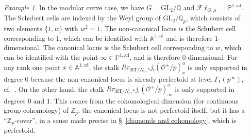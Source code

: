 \documentclass{amsart}
\theoremstyle{remark}
\newtheorem{example}[subsubsection]{Example}
\numberwithin{equation}{subsection}
\newcommand{\Q}{\QQ}
\newcommand{\Z}{\ZZ}
\newcommand{\QQ}{{\mathbb Q}}
\newcommand{\ZZ}{{\mathbb Z}}
\newcommand{\cO}{{\mathcal O}}
\newcommand{\HT}{\mathrm{HT}}
\newcommand{\Fl}{\mathscr{F}\!\ell}
\renewcommand{\(}{\left(}
\renewcommand{\)}{\right)}
\begin{document}
\begin{example} In the modular curve case, 
we have $G=\mathrm{GL}_2/\Q$ and $\Fl_{G,\mu} = \mathbb{P}^{1,\mathrm{ad}}$. 
The Schubert cells are indexed by the Weyl group of $\mathrm{GL}_2/\Q_p$, 
which consists of two elements $\{1,w\}$ with $w^2 = 1$. The non-canonical locus
is the Schubert cell corresponding to $1$, which can be identified with $\mathbb{A}^{1,\mathrm{ad}}$ and 
is therefore $1$-dimensional. The canonical locus is the Schubert cell corresponding to $w$,
which can be identified with the point $\infty\in \mathbb{P}^{1,\mathrm{ad}}$, 
and is therefore $0$-dimensional. For any rank one point $x\in \mathbb{A}^{1,\mathrm{ad}}$,
the stalk $R\pi_{\HT/N_0,*}j_{!}(\cO^+/p)^a_x$ is only supported in degree $0$
because the non-canonical locus is already perfectoid at level $\Gamma_1(p^\infty)$, 
cf.~\cite{ludwig}. On the other hand, the stalk $R\pi_{\HT/N_0,*}j_{!}(\cO^+/p)^a_\infty$
is only supported in degrees $0$ and $1$. This comes from the cohomological dimension
(for continuous group cohomology) of $\Z_p$: the canonical locus 
is not perfectoid itself, but it has a ``$\Z_p$-cover'', in a sense made precise in
\S~\ref{diamonds and cohomology}, which is perfectoid.  
\end{example}
\end{document}
